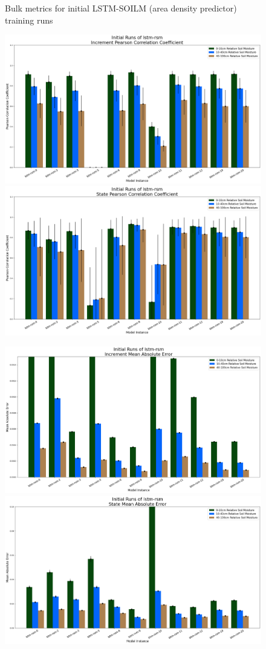 \begin{figure}[hp!]
    \caption{Bulk metrics for initial LSTM-SOILM (area density predictor) training runs}
    \label{model-init-fnn}
\end{figure}

\begin{figure}[hp!]
    \centering
    \includegraphics[width=.48\linewidth,draft=false]{figures/efficiency_initial-best/eval_test_efficiency_initial-lstm-rsm_cc_res.png}
    \includegraphics[width=.48\linewidth,draft=false]{figures/efficiency_initial-best/eval_test_efficiency_initial-lstm-rsm_cc_state.png}

    \includegraphics[width=.48\linewidth,draft=false]{figures/efficiency_initial-best/eval_test_efficiency_initial-lstm-rsm_mae_res.png}
    \includegraphics[width=.48\linewidth,draft=false]{figures/efficiency_initial-best/eval_test_efficiency_initial-lstm-rsm_mae_state.png}


\end{figure}
